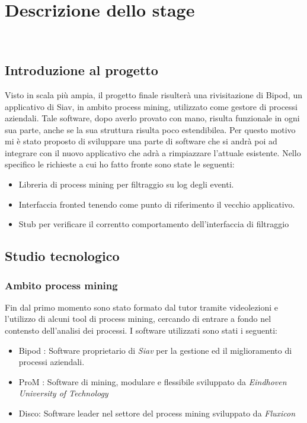 
\chapter{Descrizione dello stage}
\label{cap:descrizione-stage}

\\

\section{Introduzione al progetto}
Visto in scala più ampia, il progetto finale risulterà una rivisitazione di Bipod, un applicativo di Siav, in ambito process mining, utilizzato come gestore di processi aziendali.
Tale software, dopo averlo provato con mano, risulta funzionale in ogni sua parte, anche se la sua struttura risulta poco estendibilea. Per questo motivo mi è stato proposto di sviluppare una parte di software che si andrà poi ad integrare con il nuovo applicativo che adrà a rimpiazzare l'attuale esistente.
Nello specifico le richieste a cui ho fatto fronte sono state le seguenti:
\begin{itemize}
	\item Libreria di process mining per filtraggio su log degli eventi.
	\item Interfaccia fronted tenendo come punto di riferimento il vecchio applicativo.
	\item Stub per verificare il correntto comportamento dell'interfaccia di filtraggio
\end{itemize}
\section{Studio tecnologico}
\subsection{Ambito process mining}
Fin dal primo momento sono stato formato dal tutor tramite videolezioni e l'utilizzo di alcuni tool di process mining, cercando di entrare a fondo nel contensto dell'analisi dei processi.
I software utilizzati sono stati i seguenti:
\begin{itemize}
	\item Bipod : Software proprietario di \textit{Siav} per la gestione ed il miglioramento di processi aziendali.
	\item ProM : Software di mining, modulare e flessibile sviluppato da \textit{Eindhoven University of Technology}
	\item Disco: Software leader nel settore del process mining sviluppato da \textit{Fluxicon}
\end{itemize}
